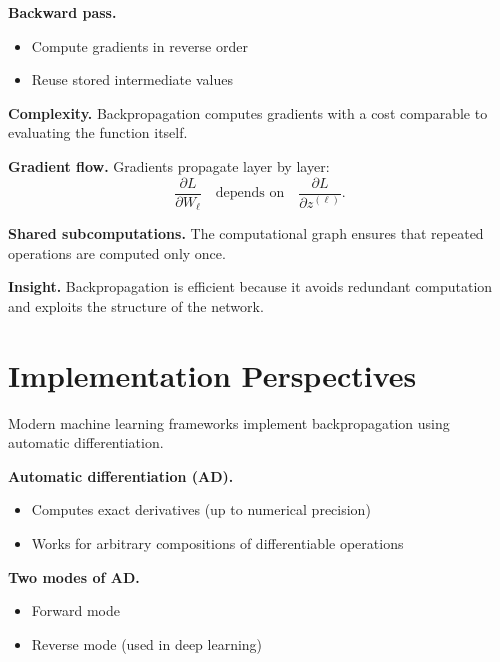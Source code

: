 \medskip

\noindent
\textbf{Backward pass.}
\begin{itemize}
    \item Compute gradients in reverse order
    \item Reuse stored intermediate values
\end{itemize}

\medskip

\noindent
\textbf{Complexity.}  
Backpropagation computes gradients with a cost comparable to evaluating the function itself.

\medskip

\noindent
\textbf{Gradient flow.}  
Gradients propagate layer by layer:
\[
\frac{\partial L}{\partial W_\ell}
\quad \text{depends on} \quad
\frac{\partial L}{\partial z^{(\ell)}}.
\]

\medskip

\noindent
\textbf{Shared subcomputations.}  
The computational graph ensures that repeated operations are computed only once.

\medskip

\noindent
\textbf{Insight.}  
Backpropagation is efficient because it avoids redundant computation and exploits the structure of the network.

\section{Implementation Perspectives}

Modern machine learning frameworks implement backpropagation using automatic differentiation.

\medskip

\noindent
\textbf{Automatic differentiation (AD).}
\begin{itemize}
    \item Computes exact derivatives (up to numerical precision)
    \item Works for arbitrary compositions of differentiable operations
\end{itemize}

\medskip

\noindent
\textbf{Two modes of AD.}
\begin{itemize}
    \item Forward mode
    \item Reverse mode (used in deep learning)
\end{itemize}

\medskip

